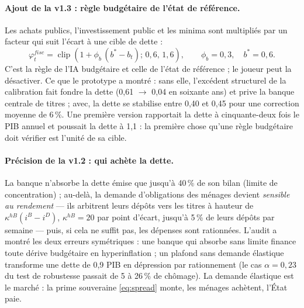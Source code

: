 \documentclass[11pt,a4paper]{article}
\newcommand{\clip}[3]{\operatorname{clip}\!\left(#1;\,#2,\,#3\right)}
\begin{document}
\paragraph{Ajout de la v1.3 : règle budgétaire de l'état de référence.} Les achats publics, l'investissement public et les minima sont multipliés par un facteur qui suit l'écart à une cible de dette :
\begin{equation}
\varphi^{fisc}_t = \clip{1 + \phi_b\,(b^\ast - b_t)}{0{,}6}{1{,}6}, \qquad \phi_b = 0{,}3,\quad b^\ast = 0{,}6 .
\label{eq:fiscrule}
\end{equation}
C'est la règle de l'IA budgétaire et celle de l'état de référence ; le joueur peut la désactiver. Ce que le prototype a montré : sans elle, l'excédent structurel de la calibration fait fondre la dette (0,61 $\to$ 0,04 en soixante ans) et prive la banque centrale de titres ; avec, la dette se stabilise entre 0,40 et 0,45 pour une correction moyenne de 6\,\%. Une première version rapportait la dette à cinquante-deux fois le PIB annuel et poussait la dette à 1,1 : la première chose qu'une règle budgétaire doit vérifier est l'unité de sa cible.

\paragraph{Précision de la v1.2 : qui achète la dette.} La banque n'absorbe la dette émise que jusqu'à 40\,\% de son bilan (limite de concentration) ; au-delà, la demande d'obligations des ménages devient \emph{sensible au rendement} — ils arbitrent leurs dépôts vers les titres à hauteur de $\kappa^{hB}(i^B-i^D)$, $\kappa^{hB}=20$ par point d'écart, jusqu'à 5\,\% de leurs dépôts par semaine — puis, si cela ne suffit pas, les dépenses sont rationnées. L'audit a montré les deux erreurs symétriques : une banque qui absorbe sans limite finance toute dérive budgétaire en hyperinflation ; un plafond sans demande élastique transforme une dette de 0,9 PIB en dépression par rationnement (le cas $\alpha=0{,}23$ du test de robustesse passait de 5 à 26\,\% de chômage). La demande élastique est le marché : la prime souveraine \eqref{eq:spread} monte, les ménages achètent, l'État paie.
\end{document}
